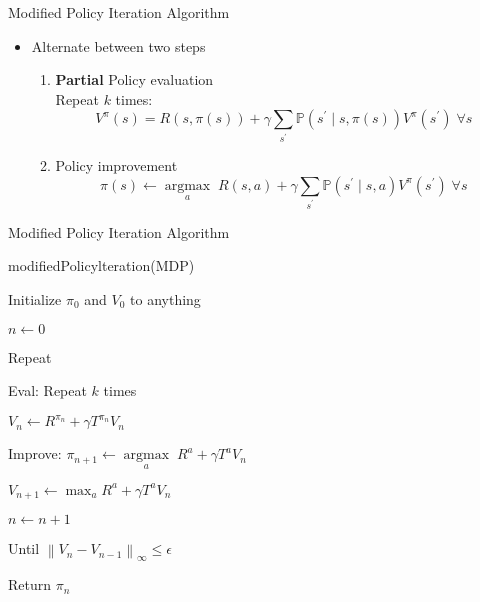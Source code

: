 \documentclass[11pt,table]{beamer}
\begin{document}
\begin{frame}{Modified Policy Iteration Algorithm}

\begin{itemize}
    \item Alternate between two steps
\begin{enumerate}
\item  \textcolor{red1}{\textbf{Partial} Policy evaluation}\\
Repeat \textcolor{red1}{$k$ times}:\\
$$
V^{\pi}(s)=R(s, \pi(s))+\gamma \sum_{s^{\prime}} \mathbb{P}\left(s^{\prime} \mid s, \pi(s)\right) V^{\pi}\left(s^{\prime}\right) \; \forall s
$$
\vspace{3mm}
\item  \textcolor{red1}{Policy improvement}\\
$$
\pi(s) \leftarrow \underset{a}{\operatorname{argmax}} \; R(s, a)+\gamma \sum_{s^{\prime}} \mathbb{P}\left(s^{\prime} \mid s, a\right) V^{\pi}\left(s^{\prime}\right) \; \forall s
$$
\end{enumerate}
\end{itemize}
    
\end{frame}

\begin{frame}{Modified Policy Iteration Algorithm}

\begin{tcolorbox}[colframe=black, boxrule=1pt, sharp corners]

\textcolor{red1}{modifiedPolicylteration(MDP)}


Initialize $\pi_{0}$ and $V_{0}$ to anything

$n \leftarrow 0$

Repeat

\qquad Eval: Repeat $k$ times

\qquad$V_{n} \leftarrow R^{\pi_{n}}+\gamma T^{\pi_{n}} V_{n}$

\qquad Improve: $\pi_{n+1} \leftarrow \underset{a}{\operatorname{argmax}} \; R^{a}+\gamma T^{a} V_{n}$

\qquad $V_{n+1} \leftarrow \max _{a} R^{a}+\gamma T^{a} V_{n}$

\qquad $n \leftarrow n+1$

Until $\left\|V_{n}-V_{n-1}\right\|_{\infty} \leq \epsilon$

Return $\pi_{n}$

\end{tcolorbox}
    
\end{frame}
\end{document}
